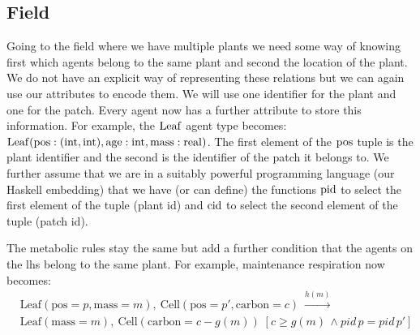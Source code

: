 \subsection{Field}
Going to the field where we have multiple plants we need some way of knowing
first which agents belong to the same plant and second the location of the
plant. We do not have an explicit way of representing these relations but we can
again use our attributes to encode them. We will use one identifier for the plant
and one for the patch. Every agent now has a further attribute to store this
information. For example, the $\mathrm{Leaf}$ agent type becomes:
$\mathrm{Leaf}(\mathrm{pos}:(\mathrm{int}, \mathrm{int}), \mathrm{age}:\mathrm{int},
\mathrm{mass}:\mathrm{real})$. The first element of the $\mathrm{pos}$ tuple is the
plant identifier and the second is the identifier of the patch it belongs to. We
further assume that we are in a suitably powerful programming language (\eg our
Haskell embedding) that we have (or can define) the functions $\mathrm{pid}$ to
select the first element of the tuple (plant id) and $\mathrm{cid}$ to select the second
element of the tuple (patch id).

The metabolic rules stay the same but add a further condition that the
agents on the lhs belong to the same plant. For example, maintenance respiration
now becomes:
\begin{align*}
  &\mathrm{Leaf}(\mathrm{pos}=p, \mathrm{mass}=m),\:
    \mathrm{Cell}(\mathrm{pos}=p', \mathrm{carbon}=c) \:
    \xrightarrow{h(m)} \\ &\mathrm{Leaf}(\mathrm{mass}=m),\:
                            \mathrm{Cell}(\mathrm{carbon}=c-g(m)) \; [c \geq g(m)
                            \, \land pid \, p = pid \, p']
\end{align*}

